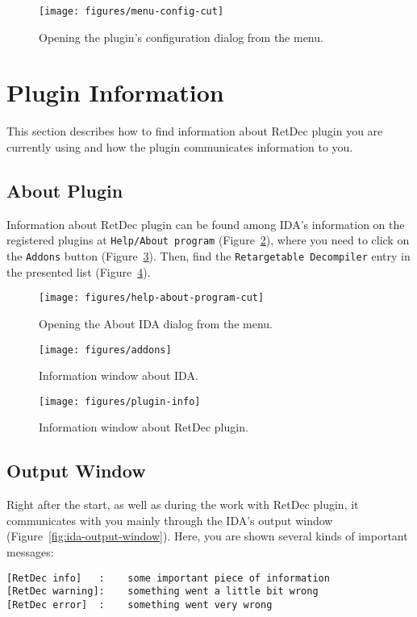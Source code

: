 \documentclass[pdftex, a4paper,12pt, oneside, svgnames]{article}
\begin{document}
\begin{figure}[!ht]
	\centering
	\texttt{[image: figures/menu-config-cut]}
	\caption{Opening the plugin's configuration dialog from the menu.}
	\label{fig:config-menu}
\end{figure}

\section{Plugin Information}
\label{sec:plugin-info}
This section describes how to find information about RetDec plugin you are currently using and how the plugin communicates information to you.

\subsection{About Plugin}
Information about RetDec plugin can be found among IDA's information on the registered plugins at \texttt{Help/About program} (Figure~\ref{fig:about-ida}), where you need to click on the \texttt{Addons} button (Figure~\ref{fig:addons}). Then, find the \texttt{Retargetable Decompiler} entry in the presented list (Figure~\ref{fig:plugin-info}).

\begin{figure}[!ht]
	\centering
	\texttt{[image: figures/help-about-program-cut]}
	\caption{Opening the About IDA dialog from the menu.}
	\label{fig:about-ida}
\end{figure}

\begin{figure}[!ht]
	\centering
	\texttt{[image: figures/addons]}
	\caption{Information window about IDA.}
	\label{fig:addons}
\end{figure}

\begin{figure}[!ht]
	\centering
	\texttt{[image: figures/plugin-info]}
	\caption{Information window about RetDec plugin.}
	\label{fig:plugin-info}
\end{figure}

\subsection{Output Window}
Right after the start, as well as during the work with RetDec plugin, it communicates with you mainly through the IDA's output window (Figure~\ref{fig:ida-output-window}). Here, you are shown several kinds of important messages:
\begin{verbatim}
[RetDec info]   :    some important piece of information
[RetDec warning]:    something went a little bit wrong
[RetDec error]  :    something went very wrong
\end{verbatim}
\end{document}
